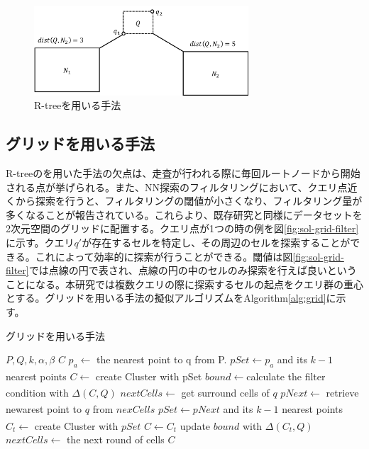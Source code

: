 \documentclass{deimj}
\begin{document}
\begin{figure}[H]
	\centering
    \includegraphics[width=8cm]{images/sol-r-tree.pdf}
    \caption{R-treeを用いる手法}
    \label{fig:sol-r-tree}
\end{figure}

\subsection{グリッドを用いる手法}
R-treeのを用いた手法の欠点は、走査が行われる際に毎回ルートノードから開始される点が挙げられる。また、NN探索のフィルタリングにおいて、クエリ点近くから探索を行うと、フィルタリングの閾値が小さくなり、フィルタリング量が多くなることが報告されている\cite{BNNH}。これらより、既存研究\cite{BNNH}と同様にデータセットを2次元空間のグリッドに配置する。クエリ点が1つの時の例を図\ref{fig:sol-grid-filter}に示す。クエリ$q'$が存在するセルを特定し、その周辺のセルを探索することができる。これによって効率的に探索が行うことができる。閾値は図\ref{fig:sol-grid-filter}では点線の円で表され、点線の円の中のセルのみ探索を行えば良いということになる。本研究では複数クエリの際に探索するセルの起点をクエリ群の重心とする。グリッドを用いる手法の擬似アルゴリズムをAlgorithm\ref{alg:grid}に示す。

\begin{algorithm}                      
\caption{グリッドを用いる手法}         
\label{alg:grid}
\begin{algorithmic}[1]                  
\renewcommand{\algorithmicrequire}{\textbf{Input:}}
\renewcommand{\algorithmicensure}{\textbf{Output:}}
\REQUIRE $P,Q,k,\alpha, \beta$
\ENSURE $C$
\STATE $p_a \xleftarrow[]{}$ the nearest point to q from P.
\STATE $pSet \xleftarrow{} p_a$ and its $k-1$ nearest points
\STATE $C \xleftarrow[]{}$ create Cluster with pSet
\STATE $bound \xleftarrow[]{} $calculate the filter condition with $\Delta(C,Q)$
\STATE $nextCells \xleftarrow[]{} $ get surround cells of $q$
\STATE $pNext \xleftarrow[]{}$ retrieve newarest point to $q$ from $nexCells$
\STATE $pSet \xleftarrow[]{} pNext$ and its $k-1$ nearest points
\STATE $C_t \xleftarrow{}$ create Cluster with $pSet$
\STATE $C \xleftarrow{} C_t$
\STATE update $bound$ with $\Delta(C_t,Q)$
\ENDIF
\STATE $nextCells \xleftarrow[]{} $ the next round of cells
\ENDWHILE
\RETURN $C$
\end{algorithmic}
\end{algorithm}
\end{document}
